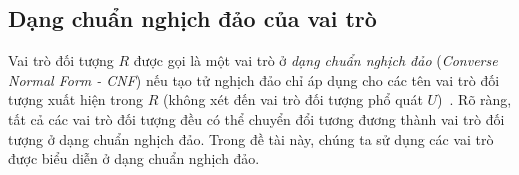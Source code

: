 %
%
%
\subsection{Dạng chuẩn nghịch đảo của vai trò}
\label{sec:Chap1.InverseNormalForm}
Vai trò đối tượng $R$ được gọi là một vai trò ở {\em dạng chuẩn nghịch đảo} ({\em Converse Normal Form - CNF}) nếu tạo tử nghịch đảo chỉ áp dụng cho các tên vai trò đối tượng xuất hiện trong $R$ (không xét đến vai trò đối tượng phổ quát $U$)~\cite{Divroodi2011B}. Rõ ràng, tất cả các vai trò đối tượng đều có thể chuyển đổi tương đương thành vai trò đối tượng ở dạng chuẩn nghịch đảo. Trong đề tài này, chúng ta sử dụng các vai trò được biểu diễn ở dạng chuẩn nghịch đảo.

